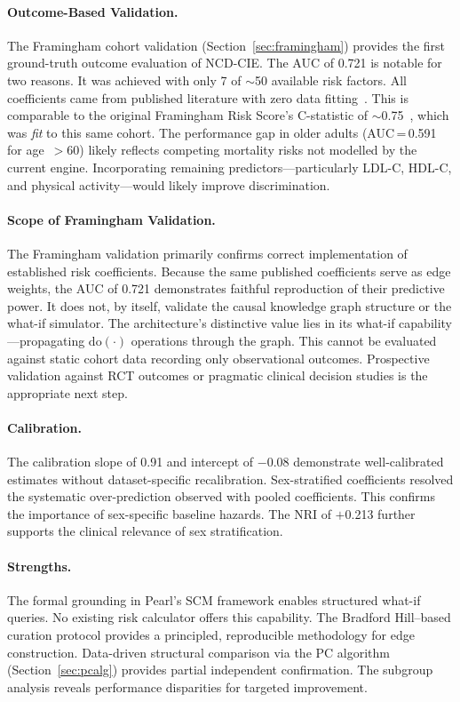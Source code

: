\documentclass[runningheads]{llncs}
\begin{document}
\paragraph{Outcome-Based Validation.}
The Framingham cohort validation (Section~\ref{sec:framingham})
provides the first ground-truth outcome evaluation of NCD-CIE\@.
The AUC of 0.721 is notable for two reasons.
It was achieved with only 7 of ${\sim}$50 available risk factors.
All coefficients came from published literature with zero data
fitting~\cite{dagostino2008}.
This is comparable to the original Framingham Risk Score's C-statistic
of ${\sim}$0.75~\cite{dagostino2008}, which was \emph{fit} to
this same cohort.
The performance gap in older adults (AUC\,=\,0.591 for
age~${>}$60) likely reflects competing mortality risks not modelled
by the current engine.
Incorporating remaining predictors---particularly LDL-C, HDL-C, and
physical activity---would likely improve discrimination.

\paragraph{Scope of Framingham Validation.}
The Framingham validation primarily confirms correct implementation
of established risk coefficients.
Because the same published coefficients serve as edge weights, the
AUC of 0.721 demonstrates faithful reproduction of their predictive
power.
It does not, by itself, validate the causal knowledge graph structure
or the what-if simulator.
The architecture's distinctive value lies in its what-if
capability---propagating $\mathrm{do}(\cdot)$ operations through the
graph.
This cannot be evaluated against static cohort data recording only
observational outcomes.
Prospective validation against RCT outcomes or pragmatic clinical
decision studies is the appropriate next step.

\paragraph{Calibration.}
The calibration slope of 0.91 and intercept of $-$0.08 demonstrate
well-calibrated estimates without dataset-specific recalibration.
Sex-stratified coefficients resolved the systematic over-prediction
observed with pooled coefficients.
This confirms the importance of sex-specific baseline hazards.
The NRI of $+$0.213 further supports the clinical relevance of
sex stratification.

\paragraph{Strengths.}
The formal grounding in Pearl's SCM framework enables structured
what-if queries.
No existing risk calculator offers this capability.
The Bradford Hill--based curation protocol provides a principled,
reproducible methodology for edge construction.
Data-driven structural comparison via the PC algorithm
(Section~\ref{sec:pcalg}) provides partial independent confirmation.
The subgroup analysis reveals performance disparities for targeted
improvement.
\end{document}
